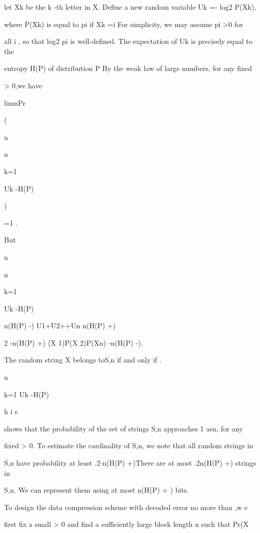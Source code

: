 let Xk be the k -th letter in X. Define a new random variable Uk =- log2 P(Xk),

where P(Xk) is equal to pi if Xk =i For simplicity, we may assume pi >0 for

all i , so that log2 pi is well-defined. The expectation of Uk is precisely equal to the

entropy H(P) of distribution P By the weak law of large numbers, for any fixed

\delta> 0,we have

limn\to\infty Pr

( \vert\vert{}

n

n\sum

k=1

Uk -H(P)

\vert\vert\vert \leq\delta

)

=1 .

But

\vert\vert{}

n

n\sum

k=1

Uk -H(P)

\vert\vert\vert \leq{} n(H(P) -\delta)  U1+U2+\cdot\cdot\cdot+Un  n(H(P) +\delta)

2 -n(H(P) +\delta) \leqP(X 1)P(X 2)\cdot\cdot\cdot P(Xn) -n(H(P) -\delta).

The random string X belongs toS\delta,n if and only if .

\vert\vert{}

n

\sumn

k=1 Uk -H(P)

\vert\vert\vert \leq\deltaT h i s

shows that the probability of the set of strings S\delta,n approaches 1 asn\to\infty , for any

fixed \delta> 0. To estimate the cardinality of S\delta,n, we note that all random strings in

S\delta,n have probability at least .2-n(H(P) +\delta)There are at most .2n(H(P) +\delta) strings in

S\delta,n. We can represent them using at most n(H(P) + \delta) bits.

To design the data compression scheme with decoded error no more than \epsilon,w e

first fix a small \delta> 0 and find a sufficiently large block length n such that Pr(X\in

